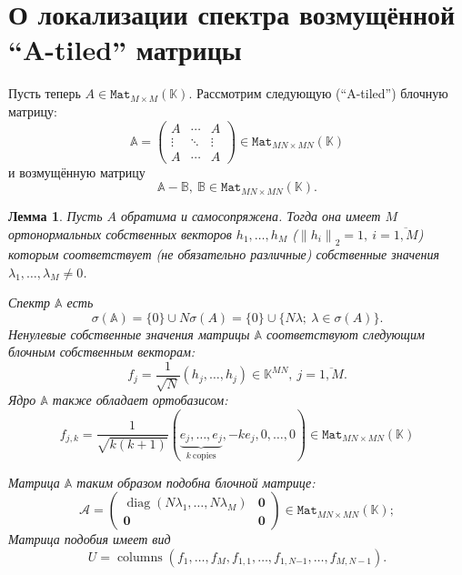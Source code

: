 \documentclass[14pt,a4paper]{extarticle}
\newtheorem{lem}{Лемма}
\theoremstyle{definition}
\begin{document}
\newpage
\section{О локализации спектра возмущённой ``A-tiled'' матрицы}

Пусть теперь \( A\in\mathtt{Mat}_{M{\times}M}(\mathbb{K}) \).
Рассмотрим следующую (``A-tiled'') блочную матрицу:
    \[
        \mathbb{A} =
        \begin{pmatrix}
            A & \cdots & A \\
            \vdots & \ddots & \vdots \\
            A & \cdots & A
        \end{pmatrix}
        \in\mathtt{Mat}_{{MN}{\times}{MN}}(\mathbb{K})
    \]
    и возмущённую матрицу
    \[
        \mathbb{A} - \mathbb{B},\ \mathbb{B}\in\mathtt{Mat}_{{MN}{\times}{MN}}(\mathbb{K}).
    \]

\begin{lem}
    Пусть \( A \) обратима и самосопряжена.
    Тогда она имеет \( M \) ортонормальных собственных векторов \( h_1, \ldots, h_M \)
    (\(\left\|h_i\right\|_2 = 1,\ i{=}\overline{1,M}\))
    которым соответствует (не обязательно различные) собственные значения
    \( \lambda_1, \ldots, \lambda_M \neq 0\).

    Спектр \( \mathbb{A} \) есть
    \[
        \sigma(\mathbb{A}) = \{0\}\cup N\sigma(A) = \{0\} \cup \{N\lambda;\ \lambda\in\sigma(A) \}.
    \]
    Ненулевые собственные значения матрицы \( \mathbb{A} \)
    соответствуют следующим блочным собственным векторам:
    \[
        f_j = \frac{1}{\sqrt{N}} (h_j, \ldots, h_j)\in \mathbb{K}^{MN},\ j=\overline{1,M}.
    \]
    Ядро \( \mathbb{A} \)
    также обладает ортобазисом:
    \[
        f_{j,k} = \frac{1}{\sqrt{k(k+1)}}
        (
        \underbrace{e_j, \ldots, e_j}_{k\ \text{copies}},
        -ke_j,
        0, \ldots, 0
        ) \in\mathtt{Mat}_{{MN}{\times}{MN}}(\mathbb{K})
    \]

    Матрица \( \mathbb{A} \) таким образом подобна блочной матрице:
    \[
        \mathcal{A} =
        \left(\begin{array}{c|c}
            \operatorname{diag}(N\lambda_1,\ldots,N\lambda_M) & \mathbf{0} \\ \hline
            \mathbf{0} & \mathbf{0}
        \end{array}\right)\in\mathtt{Mat}_{{MN}{\times}{MN}}(\mathbb{K});
    \]
    Матрица подобия имеет вид
    \[
        U = \operatorname{columns}
        \left(f_1, \ldots, f_M, f_{1,1}, \ldots, f_{1,N{-1}}, \ldots, f_{M,N{-}1}\right).
    \]
\end{lem}
\end{document}
